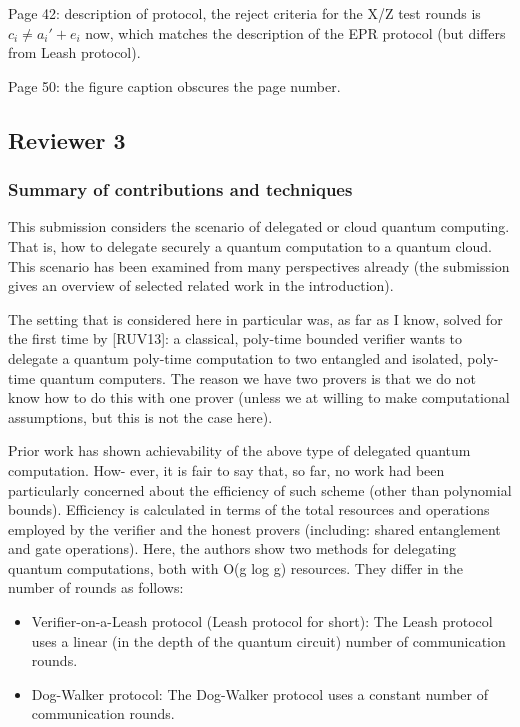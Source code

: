 \documentclass[12pt]{article}
\begin{document}
Page 42: description of protocol, the reject criteria for the X/Z test rounds is $c_i \neq a_i' + e_i$ now, which matches the description of the EPR protocol (but differs from Leash protocol).

Page 50: the figure caption obscures the page number.

\subsection*{Reviewer 3}

\subsubsection*{Summary of contributions and techniques}

This submission considers the scenario of delegated or cloud quantum computing. That is, how to
delegate securely a quantum computation to a quantum cloud. This scenario has been examined
from many perspectives already (the submission gives an overview of selected related work in the
introduction).

The setting that is considered here in particular was, as far as I know, solved for the first
time by [RUV13]: a classical, poly-time bounded verifier wants to delegate a quantum poly-time
computation to two entangled and isolated, poly-time quantum computers. The reason we have
two provers is that we do not know how to do this with one prover (unless we at willing to make
computational assumptions, but this is not the case here).

Prior work has shown achievability of the above type of delegated quantum computation. How-
ever, it is fair to say that, so far, no work had been particularly concerned about the efficiency of
such scheme (other than polynomial bounds). Efficiency is calculated in terms of the total resources
and operations employed by the verifier and the honest provers (including: shared entanglement
and gate operations). Here, the authors show two methods for delegating quantum computations,
both with O(g log g) resources. They differ in the number of rounds as follows:
	
\begin{itemize}
    \item Verifier-on-a-Leash protocol (Leash protocol for short): The Leash protocol uses a linear
(in the depth of the quantum circuit) number of communication rounds. 
\item  Dog-Walker protocol: The Dog-Walker protocol uses a constant number of communication
rounds.	
\end{itemize}
\end{document}
